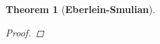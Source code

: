 \documentclass[10pt,twoside,openany,final]{memoir}
\theoremstyle{break}
\newtheorem{theorem}[section]{Theorem}
\theoremstyle{Break}
\newcommand{\lv}{\lVert}
\newcommand{\rv}{\rVert}
\begin{document}
\begin{theorem}[\bfseries{Eberlein-Smulian}]
\begin{proof}



\end{proof}
\end{theorem}
\end{document}
